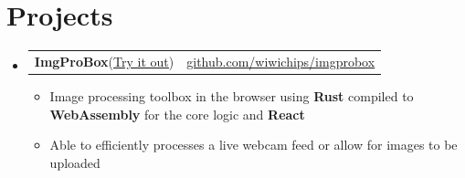 \documentclass[letterpaper,11pt]{article}
\makeatletter
\newcommand{\resumeItem}[1]{
  \item\small{
    {#1 \vspace{-2pt}}
  }
}
\newcommand{\resumeProjectHeading}[2]{
    \item
    \begin{tabular*}{0.97\textwidth}{l@{\extracolsep{\fill}}r}
      \small#1 & #2 \\
    \end{tabular*}\vspace{-7pt}
}
\newcommand{\resumeSubHeadingListStart}{\begin{itemize}[leftmargin=0.15in, label={}]}
\newcommand{\resumeSubHeadingListEnd}{\end{itemize}}
\newcommand{\resumeItemListStart}{\begin{itemize}}
\newcommand{\resumeItemListEnd}{\end{itemize}\vspace{-5pt}}
\makeatother
\begin{document}
\section{Projects}
  \resumeSubHeadingListStart
    \resumeProjectHeading
      {\textbf{ImgProBox}(\href{https://wiwichips.github.io/imgprobox/}{\underline{Try it out}})}{\href{https://github.com/wiwichips/imgprobox}{\underline{github.com/wiwichips/imgprobox}}}
      \resumeItemListStart
        \resumeItem{Image processing toolbox in the browser using \textbf{Rust} compiled to \textbf{WebAssembly} for the core logic and \textbf{React}} 
        \resumeItem{Able to efficiently processes a live webcam feed or allow for images to be uploaded}
      \resumeItemListEnd

  \resumeSubHeadingListEnd





\end{document}
